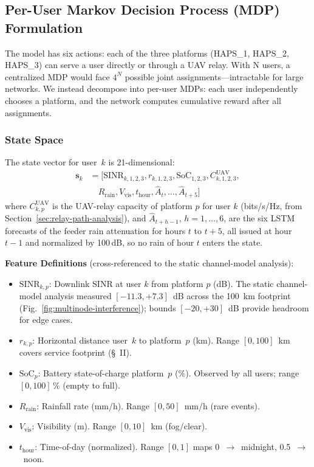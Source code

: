 \documentclass[conference]{IEEEtran}
\begin{document}
\subsection{Per-User Markov Decision Process (MDP) Formulation}

The model has six actions: each of the three platforms (HAPS\_1, HAPS\_2, HAPS\_3) can serve a user directly or through a UAV relay. With N users, a centralized MDP would face $4^N$ possible joint assignments—intractable for large networks. We instead decompose into per-user MDPs: each user independently chooses a platform, and the network computes cumulative reward after all assignments.

\subsubsection{State Space}

The state vector for user~$k$ is 21-dimensional:
\begin{align}
\mathbf{s}_k &= [\text{SINR}_{k,1,2,3}, r_{k,1,2,3}, \text{SoC}_{1,2,3}, C^{\text{UAV}}_{k,1,2,3},\nonumber\\
&\quad R_{\text{rain}}, V_{\text{vis}}, t_{\text{hour}}, \hat{A}_{t}, \dots, \hat{A}_{t+5} ]
\label{eq:state-vector}
\end{align}
where $C^{\text{UAV}}_{k,p}$ is the UAV-relay capacity of platform $p$ for user $k$ (bits/s/Hz, from Section~\ref{sec:relay-path-analysis}), and $\hat{A}_{t+h-1}$, $h=1,\dots,6$, are the six LSTM forecasts of the feeder rain attenuation for hours $t$ to $t+5$, all issued at hour $t-1$ and normalized by 100\,dB, so no rain of hour $t$ enters the state.

\noindent \textbf{Feature Definitions}
(cross-referenced to the static channel-model analysis):

\begin{itemize}\setlength{\itemsep}{0pt}
  \item $\text{SINR}_{k,p}$: Downlink SINR at user $k$ from platform $p$ (dB). The static channel-model analysis measured $[-11.3, +7.3]$~dB across the 100~km footprint (Fig.~\ref{fig:multinode-interference}); bounds $[-20, +30]$~dB provide headroom for edge cases.
  \item $r_{k,p}$: Horizontal distance user~$k$ to platform~$p$ (km). Range $[0, 100]$~km covers service footprint (§~II).
  \item $\text{SoC}_p$: Battery state-of-charge platform~$p$ (\%). Observed by all users; range $[0, 100]\,\%$ (empty to full).
  \item $R_{\text{rain}}$: Rainfall rate (mm/h). Range $[0, 50]$~mm/h (rare events).
  \item $V_{\text{vis}}$: Visibility (m). Range $[0, 10]$~km (fog/clear).
  \item $t_{\text{hour}}$: Time-of-day (normalized). Range $[0, 1]$ maps 0~$\to$~midnight, 0.5~$\to$~noon.
\end{itemize}
\end{document}
